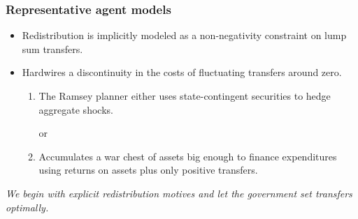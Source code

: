 \documentclass{beamer}
\begin{document}
\begin{frame}
\frametitle{Representative agent models}
\begin{itemize}
\item Redistribution is implicitly modeled as a non-negativity constraint on lump sum transfers. 

\vspace{2mm} 
 \item Hardwires a discontinuity in the costs of fluctuating transfers around zero.
 \begin{enumerate}
  
 \item The Ramsey planner either uses state-contingent securities to hedge aggregate shocks. 
 
 \begin{center}or \end{center}
 
 \item Accumulates a war chest of assets big enough to finance expenditures using returns on assets plus only positive transfers.
 
 \end{enumerate}

 
\end{itemize}

\vspace{2mm} 
\emph{\color{red}We begin with explicit redistribution motives  and let the government set transfers optimally. }

% 
% 
\end{frame}
\end{document}
